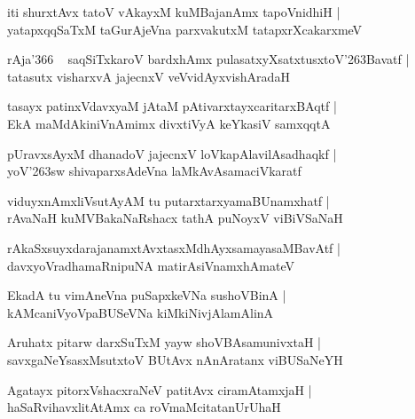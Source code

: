 \documentclass[twoside,12pt,openright]{book}
\def\S{\char'263}
\newcounter{shloka}[chapter]
\begin{document}
\begin{shloka}%
iti shurxtAvx tatoV vAkayxM kuMBajanAmx tapoVnidhiH |\\
yatapxqqSaTxM taGurAjeVna parxvakutxM tatapxrXcakarxmeV 
\end{shloka}

\begin{shloka}%
rAja\char'366 ~ saqSiTxkaroV bardxhAmx pulasatxyXsatxtusxtoV\S Bavatf |\\
tatasutx visharxvA jajecnxV  veVvidAyxvishAradaH
\end{shloka}

\begin{shloka}%
tasayx patinxVdavxyaM jAtaM pAtivarxtayxcaritarxBAqtf |\\
EkA maMdAkiniVnAmimx divxtiVyA keYkasiV samxqqtA 
\end{shloka}

\begin{shloka}%
pUravxsAyxM dhanadoV jajecnxV loVkapAlavilAsadhaqkf |\\
yoV\S sw shivaparxsAdeVna laMkAvAsamaciVkaratf
\end{shloka}

\begin{shloka}%
viduyxnAmxliVsutAyAM tu putarxtarxyamaBUnamxhatf |\\
rAvaNaH kuMVBakaNaRshacx tathA puNoyxV viBiVSaNaH 
\end{shloka}

\begin{shloka}%
rAkaSxsuyxdarajanamxtAvxtasxMdhAyxsamayasaMBavAtf |\\
davxyoVradhamaRnipuNA matirAsiVnamxhAmateV 
\end{shloka}

\begin{shloka}%
EkadA tu vimAneVna puSapxkeVNa sushoVBinA |\\
kAMcaniVyoVpaBUSeVNa kiMkiNivjAlamAlinA 
\end{shloka}

\begin{shloka}%
Aruhatx pitarw darxSuTxM yayw shoVBAsamunivxtaH |\\
savxgaNeYsasxMsutxtoV BUtAvx nAnAratanx viBUSaNeYH
\end{shloka}

\begin{shloka}%
Agatayx pitorxVshacxraNeV patitAvx ciramAtamxjaH |\\
haSaRvihavxlitAtAmx ca roVmaMcitatanUrUhaH 
\end{shloka}
\end{document}
